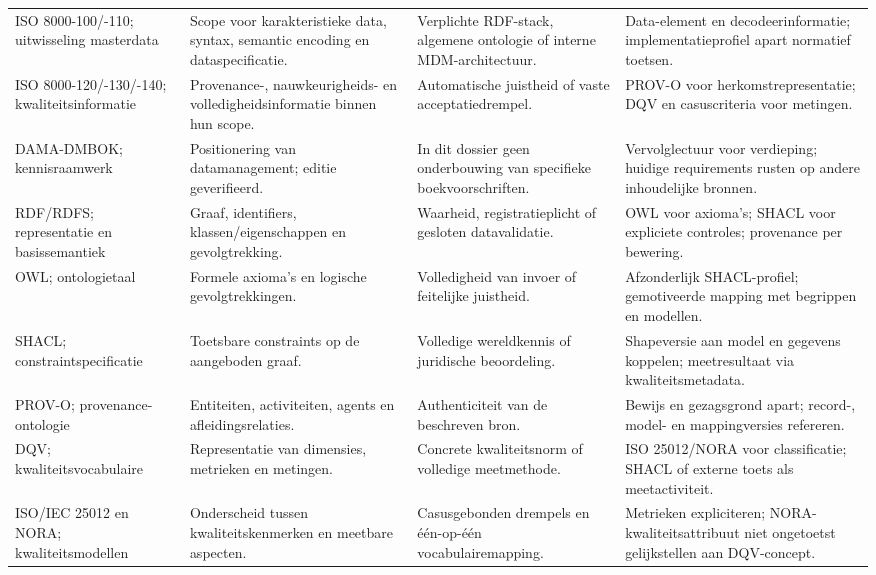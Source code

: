 \begin{longtable}{@{}P{.22\linewidth}P{.22\linewidth}P{.24\linewidth}P{.24\linewidth}@{}}
ISO 8000-100/-110; uitwisseling masterdata \citep{S02,S03} & Scope voor karakteristieke data, syntax, semantic encoding en dataspecificatie. & Verplichte RDF-stack, algemene ontologie of interne MDM-architectuur. & Data-element en decodeerinformatie; implementatieprofiel apart normatief toetsen. \\
ISO 8000-120/-130/-140; kwaliteits\-informatie \citep{S04,S05,S06} & Provenance-, nauwkeurigheids- en volledigheidsinformatie binnen hun scope. & Automatische juistheid of vaste acceptatiedrempel. & PROV-O voor herkomstrepresentatie; DQV en casuscriteria voor metingen. \\
DAMA-DMBOK; kennisraamwerk \citep{S01} & Positionering van datamanagement; editie geverifieerd. & In dit dossier geen onderbouwing van specifieke boekvoorschriften. & Vervolglectuur voor verdieping; huidige requirements rusten op andere inhoudelijke bronnen. \\
RDF/RDFS; representatie en basissemantiek \citep{S28,S29} & Graaf, identifiers, klassen/eigenschappen en gevolgtrekking. & Waarheid, registratieplicht of gesloten datavalidatie. & OWL voor axioma’s; SHACL voor expliciete controles; provenance per bewering. \\
OWL; ontologietaal \citep{S30} & Formele axioma’s en logische gevolgtrekkingen. & Volledigheid van invoer of feitelijke juistheid. & Afzonderlijk SHACL-profiel; gemotiveerde mapping met begrippen en modellen. \\
SHACL; constraint\-specificatie \citep{S32} & Toetsbare constraints op de aangeboden graaf. & Volledige wereldkennis of juridische beoordeling. & Shapeversie aan model en gegevens koppelen; meetresultaat via kwaliteitsmetadata. \\
PROV-O; provenance-ontologie \citep{S33} & Entiteiten, activiteiten, agents en afleidingsrelaties. & Authenticiteit van de beschreven bron. & Bewijs en gezagsgrond apart; record-, model- en mappingversies refereren. \\
DQV; kwaliteits\-vocabulaire \citep{S34} & Representatie van dimensies, metrieken en metingen. & Concrete kwaliteitsnorm of volledige meetmethode. & ISO 25012/NORA voor classificatie; SHACL of externe toets als meetactiviteit. \\
ISO/IEC 25012 en NORA; kwaliteitsmodellen \citep{S12,S48} & Onderscheid tussen kwaliteitskenmerken en meetbare aspecten. & Casusgebonden drempels en één-op-één vocabulairemapping. & Metrieken expliciteren; NORA-kwaliteitsattribuut niet ongetoetst gelijkstellen aan DQV-concept. \\

\end{longtable}
